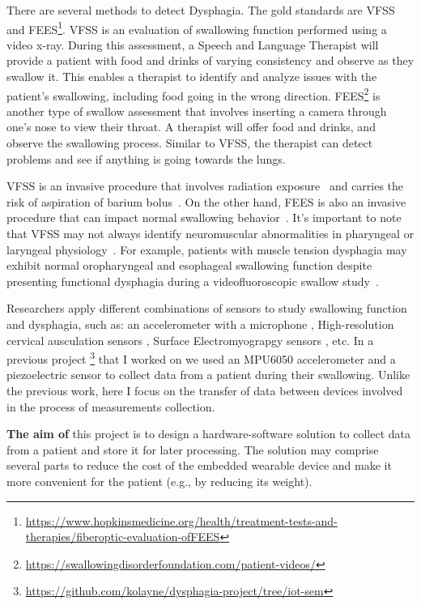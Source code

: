 \documentclass[lettersize,journal]{IEEEtran}
\begin{document}
There are several methods to detect Dysphagia. The gold standards are \gls{VFSS} and \gls{FEES}\footnote{\url{https://www.hopkinsmedicine.org/health/treatment-tests-and-therapies/fiberoptic-evaluation-ofFEES}}. \gls{VFSS} is an evaluation of swallowing function performed using a video x-ray. During this assessment, a Speech and Language Therapist will provide a patient with food and drinks of varying consistency and observe as they swallow it. This enables a therapist to identify and analyze issues with the patient's swallowing, including food going in the wrong direction. \gls{FEES}\footnote{\url{https://swallowingdisorderfoundation.com/patient-videos/}} is another type of swallow assessment that involves inserting a camera through one's nose to view their throat. A therapist will offer food and drinks, and observe the swallowing process. Similar to \gls{VFSS}, the therapist can detect problems and see if anything is going towards the lungs.


\gls{VFSS} is an invasive procedure that involves radiation exposure~\cite{morishima2016estimation} and carries the risk of aspiration of barium bolus~\cite{iizuka2018new}. On the other hand, \gls{FEES} is also an invasive procedure that can impact normal swallowing behavior~\cite{hiss2003fiberoptic}. It's important to note that VFSS may not always identify neuromuscular abnormalities in pharyngeal or laryngeal physiology~\cite{vaiman2007standardization}. For example, patients with muscle tension dysphagia may exhibit normal oropharyngeal and esophageal swallowing function despite presenting functional dysphagia during a videofluoroscopic swallow study~\cite{kang2016muscle,krasnodkebska2021diagnosis}.


Researchers apply different combinations of sensors to study swallowing function
and dysphagia, such as: an accelerometer with a microphone \cite{dudik2015accelsound},
High-resolution cervical ausculation sensors \cite{donohue2022kinematic},
Surface Electromyograpgy sensors \cite{yelin2022semg}, etc.
In a previous project
\footnote{\url{https://github.com/kolayne/dysphagia-project/tree/iot-sem}}
that I worked on we used an MPU6050 accelerometer
and a piezoelectric sensor to collect data from a patient during their swallowing. Unlike the previous work, here
I focus on the transfer of data between devices involved in the process of
measurements collection.

\textbf{The aim of} this project is to design a hardware-software solution to collect
data from a patient and store it for later processing. The solution may comprise
several parts to reduce the cost of the embedded wearable device and make it more
convenient for the patient (e.g., by reducing its weight).
\end{document}
